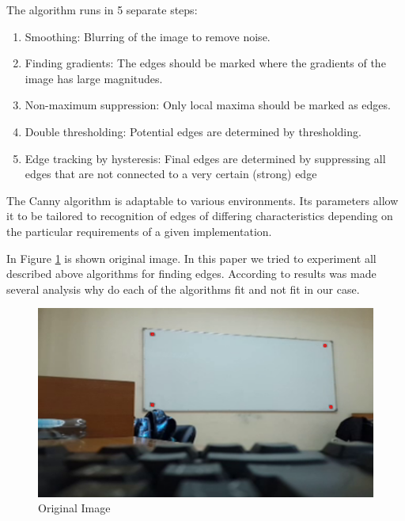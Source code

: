 The algorithm runs in 5 separate steps:
\begin{enumerate}
\item Smoothing: Blurring of the image to remove noise.
\item Finding gradients: The edges should be marked where the gradients of the image has large magnitudes.
\item Non-maximum suppression: Only local maxima should be marked as edges.
\item Double thresholding: Potential edges are determined by thresholding.
\item Edge tracking by hysteresis: Final edges are determined by suppressing all edges that are not connected to a very certain (strong) edge \cite{John}
\end{enumerate}

The Canny algorithm is adaptable to various environments. \cite{Marr} Its parameters allow it to be tailored to recognition of edges of differing characteristics depending on the particular requirements of a given implementation. \cite{Heath}

In Figure \ref{fig:original_image} is shown original image. In this paper we tried to experiment all described above algorithms for finding edges. According to results was made several analysis why do each of the algorithms fit and not fit in our case.

\begin{figure}[h]
    \centering
    \includegraphics[width=\textwidth]{Figures/original_image}
    \caption{Original Image}
    \label{fig:original_image}
\end{figure}

